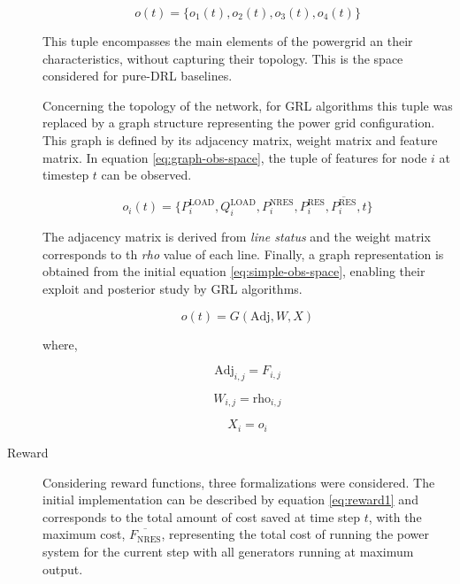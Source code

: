\begin{description}
	\begin{equation} \label{eq:simple-obs-space}
		o(t)= \{ o_{1}(t), o_{2}(t), o_{3}(t), o_{4}(t) \}
	\end{equation}
	
	This tuple encompasses the main elements of the powergrid an their characteristics, without capturing their topology. This is the space considered for pure-\ac{DRL} baselines. \par 
	Concerning the topology of the network, for \ac{GRL} algorithms this tuple was replaced by a graph structure representing the power grid configuration. This graph is defined by its adjacency matrix, weight matrix and feature matrix. In equation \ref{eq:graph-obs-space}, the tuple of features for node $i$ at timestep $t$ can be observed. 
	
	\begin{equation} \label{eq:graph-obs-space}
		o_i(t) = \{P^\text{LOAD}_i, Q^\text{LOAD}_i, P^\text{NRES}_i, P^\text{RES}_i, \overline{P^\text{RES}_i}, t\}
	\end{equation}
	
	The adjacency matrix is derived from \textit{line status} and the weight matrix corresponds to th \textit{rho} value of each line. Finally, a graph representation is obtained from the initial equation \ref{eq:simple-obs-space}, enabling their exploit and posterior study by \ac{GRL} algorithms.
	
	\begin{equation}
		o(t) = G(\text{Adj}, W, X)
	\end{equation}
	
	where,
	
	\begin{equation}
		\text{Adj}_{i,j} = F_{i,j}
	\end{equation}
	
	\begin{equation}
		W_{i,j} = \text{rho}_{i,j}
	\end{equation}
	
	\begin{equation}
		X_i = o_i
	\end{equation}
	
	\item[Reward] Considering reward functions, three formalizations were considered. The initial implementation can be described by equation \ref{eq:reward1} and corresponds to the total amount of cost saved at time step $t$, with the maximum cost, $\overline{F_\text{NRES}}$, representing the total cost of running the power system for the current step with all generators running at maximum output. \par
	

\end{description}
